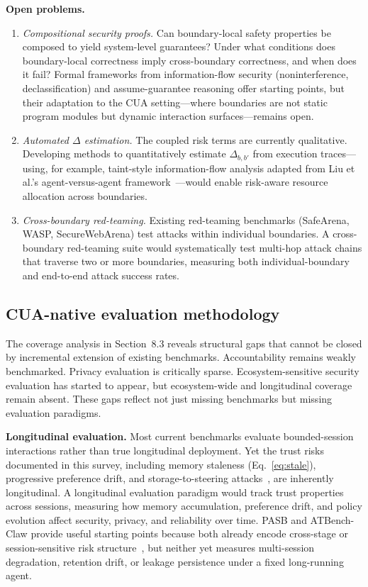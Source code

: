 \smallskip
\noindent\textbf{Open problems.}
\begin{enumerate}[leftmargin=1.5em,itemsep=2pt]
\item \emph{Compositional security proofs.} Can boundary-local safety properties be composed to yield system-level guarantees? Under what conditions does boundary-local correctness imply cross-boundary correctness, and when does it fail? Formal frameworks from information-flow security (noninterference, declassification) and assume-guarantee reasoning offer starting points, but their adaptation to the CUA setting---where boundaries are not static program modules but dynamic interaction surfaces---remains open.
\item \emph{Automated $\Delta$ estimation.} The coupled risk terms are currently qualitative. Developing methods to quantitatively estimate $\Delta_{b,b'}$ from execution traces---using, for example, taint-style information-flow analysis adapted from Liu et al.'s agent-versus-agent framework~\cite{makeagentdefeatagent2025}---would enable risk-aware resource allocation across boundaries.
\item \emph{Cross-boundary red-teaming.} Existing red-teaming benchmarks (SafeArena, WASP, SecureWebArena) test attacks within individual boundaries. A cross-boundary red-teaming suite would systematically test multi-hop attack chains that traverse two or more boundaries, measuring both individual-boundary and end-to-end attack success rates.
\end{enumerate}

\subsection{CUA-native evaluation methodology}
\label{sec:future-evaluation}

The coverage analysis in Section~8.3 reveals structural gaps that cannot be closed by incremental extension of existing benchmarks. Accountability remains weakly benchmarked. Privacy evaluation is critically sparse. Ecosystem-sensitive security evaluation has started to appear, but ecosystem-wide and longitudinal coverage remain absent. These gaps reflect not just missing benchmarks but missing evaluation paradigms.

\smallskip
\noindent\textbf{Longitudinal evaluation.}
Most current benchmarks evaluate bounded-session interactions rather than true longitudinal deployment. Yet the trust risks documented in this survey, including memory staleness (Eq.~\ref{eq:stale}), progressive preference drift, and storage-to-steering attacks~\cite{storagetosteering2026}, are inherently longitudinal. A longitudinal evaluation paradigm would track trust properties across sessions, measuring how memory accumulation, preference drift, and policy evolution affect security, privacy, and reliability over time. PASB and ATBench-Claw provide useful starting points because both already encode cross-stage or session-sensitive risk structure~\cite{doubleagent2026,atbenchclaw2026}, but neither yet measures multi-session degradation, retention drift, or leakage persistence under a fixed long-running agent.

